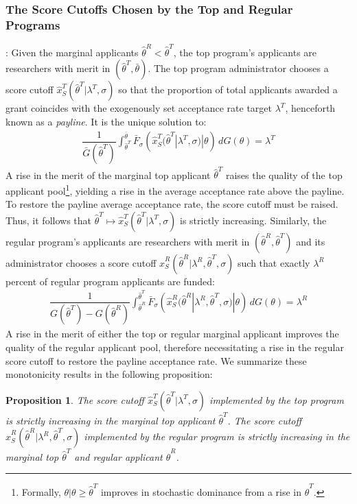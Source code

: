 \documentclass[12pt,reqno]{amsart}
\newtheorem{proposition}{Proposition}
\theoremstyle{definition}
\theoremstyle{plain} %
\begin{document}
\subsubsection{The Score Cutoffs Chosen by the Top and Regular Programs}: 
Given the marginal applicants $\hat{\theta}^R<\hat{\theta}^T$, the top program's applicants are researchers with merit in $(\hat{\theta}^T,\bar{\theta})$. The top program administrator chooses a score cutoff $\hat{x}^T_S(\hat{\theta}^T|\lambda^T,\sigma)$ so that the proportion of total applicants awarded a grant coincides with the exogenously set acceptance rate target $\lambda^T$, henceforth known as a \textit{payline}. It is the unique solution to:
\begin{align}\label{eq:supply_top}
  \dfrac{1}{\bar{G}(\hat{\theta}^T)}\int^{\bar{\theta}}_{\hat{\theta}^T} \bar{F}_{\sigma}\left(\hat{x}^T_S(\hat{\theta}^T|\lambda^T,\sigma)|\theta\right) \,dG(\theta) = \lambda^T
\end{align}
A rise in the merit of the marginal top applicant $\hat{\theta}^T$ raises the quality of the top applicant pool\footnote{Formally, $\theta|\theta\geq \hat{\theta}^T$ improves in stochastic dominance from a rise in $\hat{\theta}^T$.}, yielding a rise in the average acceptance rate above the payline. To restore the payline average acceptance rate, the score cutoff must be raised. Thus, it follows that $\hat{\theta}^T\mapsto \hat{x}^T_S(\hat{\theta}^T|\lambda^T,\sigma)$ is strictly increasing. Similarly, the regular program's applicants are researchers with merit in $(\hat{\theta}^R,\hat{\theta}^T)$ and its administrator chooses a score cutoff $\hat{x}_S^R(\hat{\theta}^R|\lambda^R,\hat{\theta}^T,\sigma)$ such that exactly $\lambda^R$ percent of regular program applicants are funded:
\begin{align}\label{eq:supply_regular}
  \dfrac{1}{G(\hat{\theta}^T) - G(\hat{\theta}^R)}\int^{\hat{\theta}^T}_{\hat{\theta}^R} \bar{F}_{\sigma}\left(\hat{x}^R_S(\hat{\theta}^R|\lambda^R, \hat{\theta}^T,\sigma)|\theta\right) \,dG(\theta) = \lambda^R
\end{align}
A rise in the merit of either the top or regular marginal applicant improves the quality of the regular applicant pool, therefore necessitating a rise in the regular score cutoff to restore the payline acceptance rate. We summarize these monotonicity results in the following proposition:
\begin{proposition}\label{prop:supply}
The score cutoff $\hat{x}_S^T(\hat{\theta}^T|\lambda^T,\sigma)$ implemented by the top program is strictly increasing in the marginal top applicant $\hat{\theta}^T$. The score cutoff $\hat{x}_S^R(\hat{\theta}^R|\lambda^R, \hat{\theta}^T,\sigma)$ implemented by the regular program is strictly increasing in the marginal top $\hat{\theta}^T$ and regular applicant $\hat{\theta}^R$. 
\end{proposition}
\end{document}
